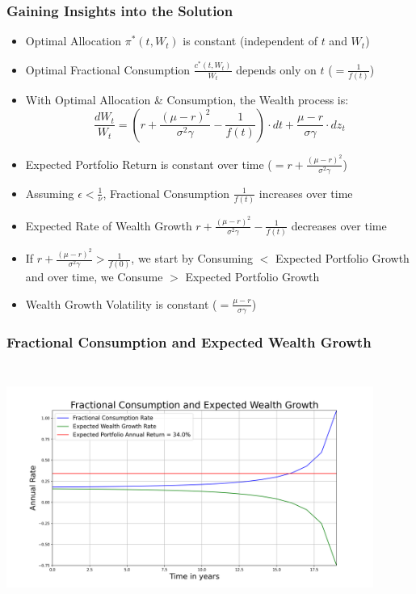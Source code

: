 \documentclass[handout]{beamer}
\begin{document}
\begin{frame}
\frametitle{Gaining Insights into the Solution}
\pause
\begin{itemize}[<+->]
\item Optimal Allocation $\pi^*(t, W_t)$ is constant (independent of $t$ and $W_t$)
\item Optimal Fractional Consumption $\frac {c^*(t, W_t)} {W_t}$ depends only on $t$ ($=\frac 1 {f(t)}$)
\item With Optimal Allocation \& Consumption, the Wealth process is:
$$\frac {dW_t} {W_t} = (r + \frac {(\mu - r)^2} {\sigma^2 \gamma} - \frac 1 {f(t)}) \cdot dt + \frac {\mu - r} {\sigma \gamma} \cdot dz_t$$
\item Expected Portfolio Return is constant over time ($=r + \frac {(\mu - r)^2} {\sigma^2 \gamma}$)
\item Assuming $\epsilon < \frac 1 {\nu}$, Fractional Consumption $\frac 1 {f(t)}$ increases over time
\item Expected Rate of Wealth Growth $r + \frac {(\mu - r)^2} {\sigma^2 \gamma} - \frac 1 {f(t)}$ decreases over time
\item If $r + \frac {(\mu - r)^2} {\sigma^2 \gamma} > \frac 1 {f(0)}$, we start by Consuming $<$ Expected Portfolio Growth and over time, we Consume $>$ Expected Portfolio Growth
\item Wealth Growth Volatility is constant ($= \frac {\mu - r} {\sigma \gamma}$)
\end{itemize}
\end{frame}

\begin{frame}
\frametitle{Fractional Consumption and Expected Wealth Growth}
\includegraphics[width=12cm, height=8cm]{portfolio_growth.png}
\end{frame}
\end{document}
